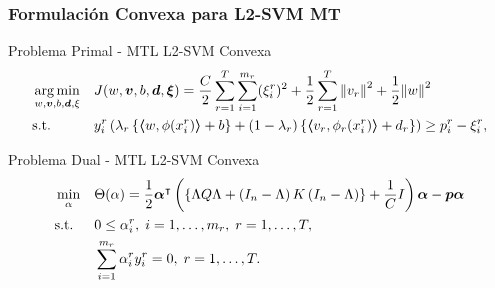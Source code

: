\documentclass[aspectratio=43]{beamer}
\DeclareMathOperator*{\argmin}{arg\min}
\newcommand{\norm}[1]{\left\lVert#1\right\rVert}
\newcommand{\upper}[1]{\expandafter\MakeUppercase\expandafter{#1}}
\newcommand{\mymat}[1]{\upper{#1}}
\newcommand{\myvec}[1]{\bm{#1}}
\newcommand{\fv}[1]{\myvec{#1}}
\newcommand{\fm}[1]{\mymat{#1}}
\newcommand{\dotp}[2]{\bm{\left\langle} #1, #2 \bm{\right\rangle}}
\newcommand{\nsamples}{n}
\newcommand{\ntasks}{T}
\newcommand{\npertask}{m}
\begin{document}
\begin{frame}
      \frametitle{Formulación Convexa para L2-SVM MT}

      \begin{block}{Problema Primal - MTL L2-SVM Convexa}
            \begin{equation}\nonumber
                  \begin{aligned}
                  & \argmin_{w, \fv{v}, b, \fv{d}, \xi}
                  & & {J({w}, \fv{v}, b, \fv{d}, \fv{\xi}) = \frac{C}{2} \sum_{r= 1}^T \sum_{i=1}^{m_r} ({\xi_{i}^r})^2 + \frac{1}{2} \sum_{r= 1}^T{\norm{{v}_r}^2} + \frac{1}{2} {\norm{{w}}}^2} \\
                  & \text{s.t.}
                  & & y_{i}^r \left(\lambda_r \left\lbrace \dotp{w}{\phi(x_{i}^r)} + b  \right\rbrace + (1 - \lambda_r) \left\lbrace \dotp{{v}_r}{\phi_r(x_{i}^r)} + d_r \right\rbrace  \right) \geq p_{i}^r - \xi_{i}^r ,  \\
                  \end{aligned}
              \end{equation}
      \end{block}

      \begin{block}{Problema Dual - MTL L2-SVM Convexa}
            \begin{equation}\nonumber
                  \begin{aligned}
                  & \min_{\alpha} && \Theta(\alpha) = \frac{1}{2} \fv{\alpha}^\intercal \left( \left\lbrace \Lambda \fm{Q} \Lambda + \left(\fm{I}_{\nsamples} - \Lambda \right) \fm{K} \left(\fm{I}_{\nsamples} - \Lambda \right) \right\rbrace + \frac{1}{C} \fm{I} \right) \fv{\alpha} - \fv{p} \fv{\alpha} \\
                  & \text{s.t.}
                  & & 0 \leq \alpha_i^r , \; i=1, \ldots, \npertask_r,\; r=1, \ldots, \ntasks, \\
                  & & & \sum_{i=1}^{m_r} \alpha_i^r y_i^r = 0, \;  r=1, \ldots, \ntasks . \\
                  \end{aligned}
              \end{equation}
      \end{block}
      

\end{frame}


\end{document}
